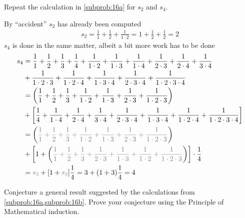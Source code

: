 \documentclass[a4paper, english, 12pt]{article} %
\begin{document}
\begin{subproblem}
    \label{subprob:16b}
  Repeat the calculation in \cref{subprob:16a} for $s_2$ and $s_4$.
\end{subproblem}

\begin{answer}
  By ``accident'' $s_2$ has already been computed
  \begin{align*}
    s_2 = \frac{1}{1} + \frac{1}{2} + \frac{1}{1 \cdot 2} = 1 + \frac{1}{2} + \frac{1}{2} = 2
  \end{align*}
  $s_4$ is done in the same matter, albeit a bit more work has to be done
  \begin{align*}
        s_4
    & = \frac{1}{1} + \frac{1}{2} + \frac{1}{3} + \frac{1}{4}
      + \frac{1}{1 \cdot 2} + \frac{1}{1 \cdot 3} + \frac{1}{1 \cdot 4} 
      + \frac{1}{2 \cdot 3} + \frac{1}{2 \cdot 4} + \frac{1}{3 \cdot 4} \\
    & + \frac{1}{1 \cdot 2 \cdot 3} + \frac{1}{1 \cdot 2 \cdot 4} + \frac{1}{1 \cdot 3 \cdot 4}
    + \frac{1}{2 \cdot 3 \cdot 4} + \frac{1}{1\cdot 2 \cdot 3 \cdot 4} \\
    & = \left(   \frac{1}{1} + \frac{1}{2} + \frac{1}{3}
      + \frac{1}{1\cdot 2} + \frac{1}{ 1 \cdot 3} + \frac{1}{2 \cdot 3} + \frac{1}{1 \cdot 2 \cdot 3} \right)\\
    & + \left[ \frac{1}{4}
      + \frac{1}{1\cdot 4} + \frac{1}{2 \cdot 4} + \frac{1}{3 \cdot 4} + \frac{1}{2 \cdot 3 \cdot 4} + \frac{1}{1 \cdot 3 \cdot 4} + \frac{1}{1 \cdot 2 \cdot 4} + \frac{1}{1 \cdot 2 \cdot 3 \cdot 4}\right] \\
    & = \left(   \textcolor{gray}{\frac{1}{1} + \frac{1}{2} + \frac{1}{3}
      + \frac{1}{1\cdot 2} + \frac{1}{ 1 \cdot 3} + \frac{1}{2 \cdot 3} + \frac{1}{1 \cdot 2 \cdot 3}} \right)\\
    & + \left[ 1 
      +  \left( \textcolor{gray}{\frac{1}{1} +  \frac{1}{2} + \frac{1}{3} + \frac{1}{2 \cdot 3} + \frac{1}{1 \cdot 3} + \frac{1}{1 \cdot 2} + \frac{1}{1 \cdot 2 \cdot 3}}\right)\right] \cdot \frac{1}{4} \\
    & = \textcolor{gray}{s_3} + [1 + \textcolor{gray}{s_3}]\frac{1}{4} = 3 + (1+3)\frac{1}{4} = 4 
  \end{align*}
\end{answer}

\begin{subproblem}
  Conjecture a general result suggested by the calculations from
  \cref{subprob:16a,subprob:16b}. Prove your conjecture using the Principle of
  Mathematical induction.
\end{subproblem}
\end{document}
